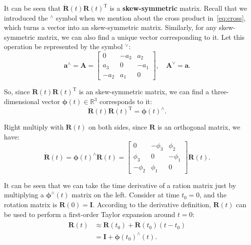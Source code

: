 It can be seen that $\dot{\mathbf{R}} (t) \mathbf{R} {(t)^\mathrm{T}}$ is a \textbf{skew-symmetric} matrix. Recall that we introduced the $^\wedge$ symbol when we mention about the cross product in~\eqref{eq:cross}, which turns a vector into an skew-symmetric matrix. Similarly, for any skew-symmetric matrix, we can also find a unique vector corresponding to it. Let this operation be represented by the symbol $^{\vee}$:
\begin{equation}
{\mathbf{a}^ \wedge } = \mathbf{A} = \left[ {\begin{array}{*{20}{c}}
    0&{ - {a_3}}&{{a_2}}\\
    {{a_3}}&0&{ - {a_1}}\\
    { - {a_2}}&{{a_1}}&0
    \end{array}} \right], \quad
{ \mathbf{A}^ \vee } = \mathbf{a}.
\end{equation}

So, since $\dot{\mathbf{R}} (t) \mathbf{R} {(t)^\mathrm{T}}$ is an skew-symmetric matrix, we can find a three-dimensional vector $\boldsymbol{\phi} (t) \in \mathbb{R}^3$ corresponds to it:
\[
\dot{\mathbf{R}} (t) \mathbf{R}(t)^\mathrm{T} = \boldsymbol{\phi} (t) ^ {\wedge}.
\]

Right multiply with $\mathbf{R}(t)$ on both sides, since $\mathbf{R}$ is an orthogonal matrix, we have:
\begin{equation}
\label{eq:dR}
\dot{\mathbf{R}} (t) = \boldsymbol{\phi} (t)^{\wedge} \mathbf{R}(t) =
\left[ {\begin{array}{*{20}{c}}
    0&{ - {\phi _3}}&{{\phi _2}}\\
    {{\phi _3}}&0&{ - {\phi _1}}\\
    { - {\phi _2}}&{{\phi _1}}&0
    \end{array}} \right] \mathbf{R} (t).
\end{equation}

It can be seen that we can take the time derivative of a ration matrix just by multiplying a $\boldsymbol{\phi}^\wedge (t)$ matrix on the left. Consider at time $t_0=0$, and the rotation matrix is $\mathbf{R}(0) = \mathbf{I}$. According to the derivative definition, $\mathbf{R}(t)$ can be used to perform a first-order Taylor expansion around $t=0$:
\begin{equation}
\begin{aligned}
\mathbf{R} \left( t \right) & \approx \mathbf{R} \left( t_0 \right) + \dot {\mathbf{R}} \left( {{t_0}} \right)\left ( {t - {t_0}} \right)\\
&= \mathbf{I} + \boldsymbol{\phi} {\left( {{t_0}} \right)^ \wedge } \left( t \right).
\end{aligned}
\end{equation}


